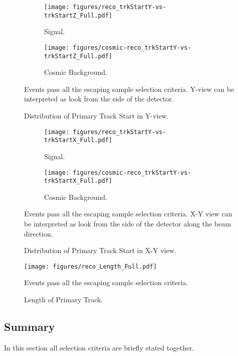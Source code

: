 \begin{figure}[!th]
\centering
\begin{subfigure}[t]{0.95\textwidth}
  \centering
  \texttt{[image: figures/reco\_trkStartY-vs-trkStartZ\_Full.pdf]}
  \caption{Signal.}
  \label{fig:startYZ_sig}
\end{subfigure}
\vspace{0.5cm}
\newline
\begin{subfigure}[t]{0.95\textwidth}
  \centering
  \texttt{[image: figures/cosmic-reco\_trkStartY-vs-trkStartZ\_Full.pdf]}
  \caption{Cosmic Background.}
  \label{fig:startYZ_bkg}
\end{subfigure}
\caption{ Distribution of Primary Track Start in Y-view.}
{ Events pass all the escaping sample selection criteria. Y-view can be interpreted as look from the side of the detector. }
\label{fig:startYZ}
\end{figure}

\begin{figure}[!th]
\centering
\begin{subfigure}[t]{0.95\textwidth}
  \centering
  \texttt{[image: figures/reco\_trkStartY-vs-trkStartX\_Full.pdf]}
  \caption{Signal.}
  \label{fig:startYX_sig}
\end{subfigure}
\vspace{0.5cm}
\newline
\begin{subfigure}[t]{0.95\textwidth}
  \centering
  \texttt{[image: figures/cosmic-reco\_trkStartY-vs-trkStartX\_Full.pdf]}
  \caption{Cosmic Background.}
  \label{fig:startYX_bkg}
\end{subfigure}
\caption{ Distribution of Primary Track Start in X-Y view.}
{ Events pass all the escaping sample selection criteria. X-Y view can be interpreted as look from the side of the detector
along the beam direction. }
\label{fig:startYX}
\end{figure}

\begin{figure}[!th]
\centering
\texttt{[image: figures/reco\_Length\_Full.pdf]}
\caption{Length of Primary Track.}
{ Events pass all the escaping sample selection criteria. }
\label{fig:length_3}
\end{figure}

\clearpage
\subsection{Summary}
In this section all selection criteria are briefly stated together. 

